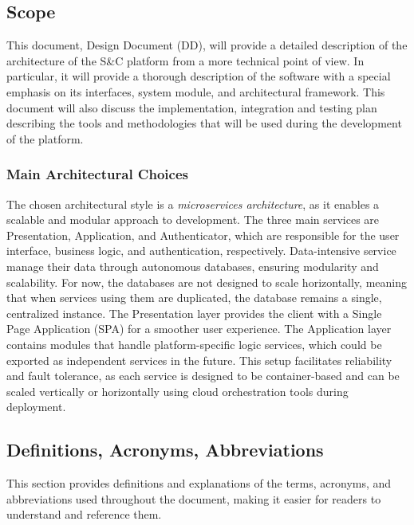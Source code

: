 \subsection{Scope}
This document, Design Document (DD), will provide a detailed description of the architecture of the S\&C platform from a more technical point of view. In particular, it will provide a thorough description of the software with a special emphasis on its interfaces, system module, and architectural framework.
This document will also discuss the implementation, integration and testing plan describing the tools and methodologies that will be used during the development of the platform.

\subsubsection{Main Architectural Choices}
The chosen architectural style is a \textit{microservices architecture}, as it enables a scalable and modular approach to development. The three main services are Presentation, Application, and Authenticator, which are responsible for the user interface, business logic, and authentication, respectively. Data-intensive service manage their data through autonomous databases, ensuring modularity and scalability. For now, the databases are not designed to scale horizontally, meaning that when services using them are duplicated, the database remains a single, centralized instance. The Presentation layer provides the client with a Single Page Application (SPA) for a smoother user experience. The Application layer contains modules that handle platform-specific logic services, which could be exported as independent services in the future. This setup facilitates reliability and fault tolerance, as each service is designed to be container-based and can be scaled vertically or horizontally using cloud orchestration tools during deployment.

\subsection{Definitions, Acronyms, Abbreviations} 
This section provides definitions and explanations of the terms, acronyms, and abbreviations used throughout the document, making it easier for readers to understand and reference them.

